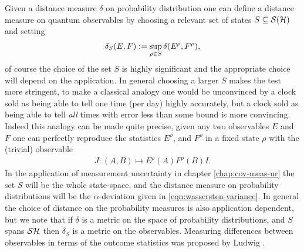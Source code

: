 Given a distance measure $\delta$ on probability distribution one can define a distance measure on quantum observables by choosing a relevant set of states $S\subseteq \dops[\hcal]$ and setting
\begin{align}
  \delta_S(E, F) := \sup_{\rho\in S} \delta(E^\rho, F^\rho),
\end{align}
of course the choice of the set $S$ is highly significant and the appropriate choice will depend on the application. In general choosing a larger $S$ makes the test more stringent, to make a classical analogy one would be unconvinced by a clock sold as being able to tell one time (per day) highly accurately, but a clock sold as being able to tell \emph{all} times with error less than some bound is more convincing. Indeed this analogy can be made quite precise, given any two observables $E$ and $F$ one can perfectly reproduce the statistics $E^\rho$, and $F^\rho$ in a fixed state $\rho$ with the (trivial) observable
\begin{align}
  J: (A,B) \mapsto E^\rho(A) F^\rho(B) I.
\end{align}
In the application of measurement uncertainty in chapter \ref{chap:cov-meas-ur} the set $S$ will be the whole state-space, and the distance measure on probability distributions will be the  $\alpha$-deviation given in \eqref{eqn:wassersten-variance}. In general the choice of distance on the probability measures is also application dependent, but we note that if $\delta$ is a metric on the space of probability distributions, and $S$ spans $\dops{\hcal}$ then $\delta_S$ is a metric on the observables. Measuring differences between observables in terms of the outcome statistics was proposed by Ludwig \cite{ludwig-foundations-of-qm}.







